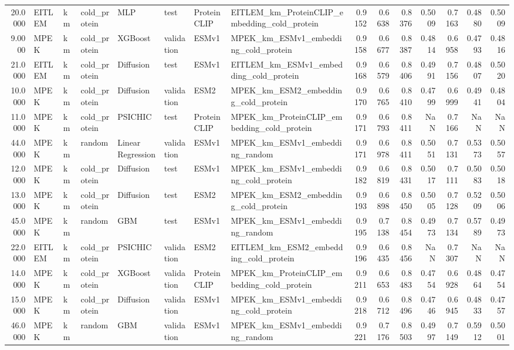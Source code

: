 \begin{tabular}{rlllllllrrrrrrr}
20.0000 & EITLEM & km & cold_protein & MLP & test & ProteinCLIP & EITLEM_km_ProteinCLIP_embedding_cold_protein & 0.9152 & 0.6638 & 0.8376 & 0.5009 & 0.7163 & 0.4880 & 0.5009 \\
9.0000 & MPEK & km & cold_protein & XGBoost & validation & ESMv1 & MPEK_km_ESMv1_embedding_cold_protein & 0.9158 & 0.6677 & 0.8387 & 0.4814 & 0.6958 & 0.4793 & 0.4816 \\
21.0000 & EITLEM & km & cold_protein & Diffusion & test & ESMv1 & EITLEM_km_ESMv1_embedding_cold_protein & 0.9168 & 0.6579 & 0.8406 & 0.4991 & 0.7156 & 0.4807 & 0.5020 \\
10.0000 & MPEK & km & cold_protein & Diffusion & validation & ESM2 & MPEK_km_ESM2_embedding_cold_protein & 0.9170 & 0.6765 & 0.8410 & 0.4799 & 0.6999 & 0.4941 & 0.4804 \\
11.0000 & MPEK & km & cold_protein & PSICHIC & test & ProteinCLIP & MPEK_km_ProteinCLIP_embedding_cold_protein & 0.9171 & 0.6793 & 0.8411 & NaN & 0.7166 & NaN & NaN \\
44.0000 & MPEK & km & random & Linear Regression & validation & ESMv1 & MPEK_km_ESMv1_embedding_random & 0.9171 & 0.6978 & 0.8411 & 0.5051 & 0.7131 & 0.5373 & 0.5057 \\
12.0000 & MPEK & km & cold_protein & Diffusion & test & ESMv1 & MPEK_km_ESMv1_embedding_cold_protein & 0.9182 & 0.6819 & 0.8431 & 0.5017 & 0.7111 & 0.5083 & 0.5018 \\
13.0000 & MPEK & km & cold_protein & Diffusion & test & ESM2 & MPEK_km_ESM2_embedding_cold_protein & 0.9193 & 0.6898 & 0.8450 & 0.5005 & 0.7128 & 0.5209 & 0.5006 \\
45.0000 & MPEK & km & random & GBM & test & ESMv1 & MPEK_km_ESMv1_embedding_random & 0.9195 & 0.7138 & 0.8454 & 0.4973 & 0.7134 & 0.5789 & 0.4973 \\
22.0000 & EITLEM & km & cold_protein & PSICHIC & validation & ESM2 & EITLEM_km_ESM2_embedding_cold_protein & 0.9196 & 0.6435 & 0.8456 & NaN & 0.7307 & NaN & NaN \\
14.0000 & MPEK & km & cold_protein & XGBoost & validation & ProteinCLIP & MPEK_km_ProteinCLIP_embedding_cold_protein & 0.9211 & 0.6653 & 0.8483 & 0.4754 & 0.6928 & 0.4864 & 0.4754 \\
15.0000 & MPEK & km & cold_protein & Diffusion & validation & ESMv1 & MPEK_km_ESMv1_embedding_cold_protein & 0.9218 & 0.6712 & 0.8496 & 0.4746 & 0.6945 & 0.4833 & 0.4757 \\
46.0000 & MPEK & km & random & GBM & validation & ESMv1 & MPEK_km_ESMv1_embedding_random & 0.9221 & 0.7176 & 0.8503 & 0.4997 & 0.7149 & 0.5912 & 0.5001 \\

\end{tabular}
